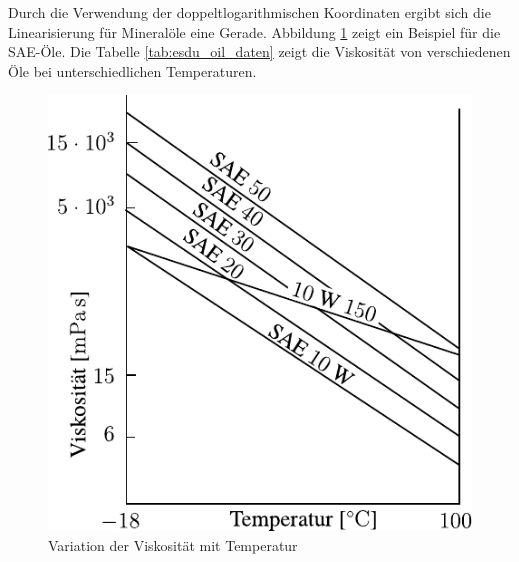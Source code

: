 Durch die Verwendung der doppeltlogarithmischen Koordinaten ergibt sich die Linearisierung für Mineralöle eine Gerade.
Abbildung \ref{fig:variation_der_viskositaet_mit_temperatur} zeigt ein Beispiel für die SAE-Öle.
Die Tabelle \ref{tab:esdu_oil_daten} zeigt die Viskosität von verschiedenen Öle bei unterschiedlichen Temperaturen.
\begin{figure}[htb]
    \centering
    \includegraphics[]{./images/visko_temperatur.pdf}
    \caption{Variation der Viskosität mit Temperatur \cite{gohar_1988}}
    \label{fig:variation_der_viskositaet_mit_temperatur}
\end{figure}

